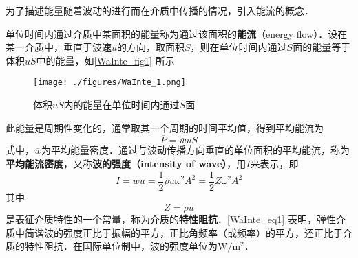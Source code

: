 
\begin{issues}
\end{issues}


为了描述能量随着波动的进行而在介质中传播的情况，引入能流的概念．

单位时间内通过介质中某面积的能量称为通过该面积的\textbf{能流}（energy flow）．设在某一介质中，垂直于波速$u$的方向，取面积$S$，则在单位时间内通过$S$面的能量等于体积$uS$中的能量，如\autoref{WaInte_fig1} 所示
\begin{figure}[ht]
\centering
\texttt{[image: ./figures/WaInte\_1.png]}
\caption{体积$uS$内的能量在单位时间内通过$S$面} \label{WaInte_fig1}
\end{figure}

此能量是周期性变化的，通常取其一个周期的时间平均值，得到平均能流为
\begin{equation}
\overline{P}=\overline{w} u S
\end{equation}
式中，$\overline w$为平均能量密度．通过与波动传播方向垂直的单位面积的平均能流，称为\textbf{平均能流密度}，又称\textbf{波的强度（intensity of wave）}，用$I$来表示，即
\begin{equation} \label{WaInte_eq1}
I=\overline{w} u=\frac{1}{2} \rho u \omega^{2} A^{2}=\frac{1}{2} Z \omega^{2} A^{2}
\end{equation}
其中
\begin{equation}
Z=\rho u
\end{equation}
是表征介质特性的一个常量，称为介质的\textbf{特性阻抗}．\autoref{WaInte_eq1} 表明，弹性介质中简谐波的强度正比于振幅的平方，正比角频率（或频率）的平方，还正比于介质的特性阻抗．在国际单位制中，波的强度单位为$\mathrm{W}/\mathrm{m^2}$．